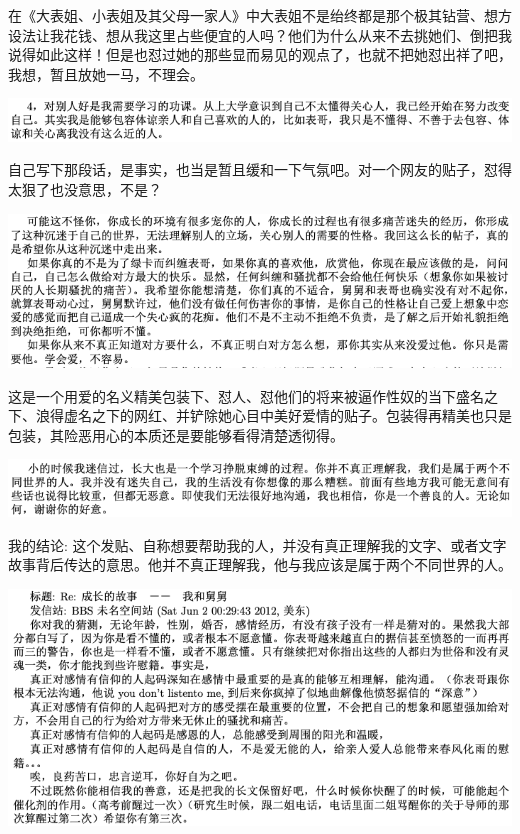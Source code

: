 \documentclass[9pt, b5paper]{article}
\begin{document}
在《大表姐、小表姐及其父母一家人》中大表姐不是绐终都是那个极其钻营、想方设法让我花钱、想从我这里占些便宜的人吗？他们为什么从来不去挑她们、倒把我说得如此这样！但是也怼过她的那些显而易见的观点了，也就不把她怼出祥了吧，我想，暂且放她一马，不理会。 

\begin{center}
\includegraphics[width=.9\linewidth]{./pic/p1p114-6.png}
\end{center}

自己写下那段话，是事实，也当是暂且缓和一下气氛吧。对一个网友的贴子，怼得太狠了也没意思，不是？

\begin{center}
\includegraphics[width=.9\linewidth]{./pic/p1p110-3.png}
\end{center}

这是一个用爱的名义精美包装下、怼人、怼他们的将来被逼作性奴的当下盛名之下、浪得虚名之下的网红、并铲除她心目中美好爱情的贴子。包装得再精美也只是包装，其险恶用心的本质还是要能够看得清楚透彻得。 

\begin{center}
\includegraphics[width=.9\linewidth]{./pic/p1p115-2.png}
\end{center}

我的结论: 这个发贴、自称想要帮助我的人，并没有真正理解我的文字、或者文字故事背后传达的意思。他并不真正理解我，他与我应该是属于两个不同世界的人。

\begin{center}
\includegraphics[width=.9\linewidth]{./pic/p1p115-3.png}
\end{center}
\end{document}

